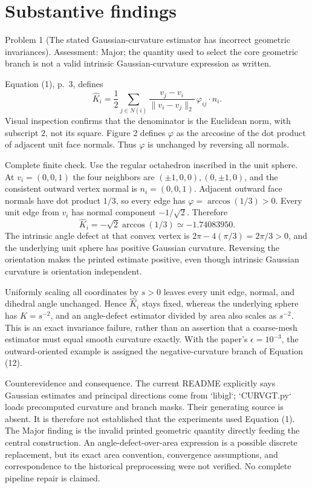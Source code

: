 \documentclass[10pt]{article}
\begin{document}
\section*{Substantive findings}
Problem 1 (The stated Gaussian-curvature estimator has incorrect geometric invariances).  Assessment: Major; the quantity used to select the core geometric branch is not a valid intrinsic Gaussian-curvature expression as written.\par
Equation (1), p. 3, defines \[\widehat K_i=\frac12\sum_{j\in N(i)}
\frac{v_j-v_i}{\|v_i-v_j\|_2}\,\varphi_{ij}\cdot n_i.\] Visual inspection confirms that the denominator is the Euclidean norm, with subscript \(2\), not its square. Figure 2 defines \(\varphi\) as the arccosine of the dot product of adjacent unit face normals. Thus \(\varphi\) is unchanged by reversing all normals.\par
Complete finite check. Use the regular octahedron inscribed in the unit sphere. At \(v_i=(0,0,1)\) the four neighbors are \((\pm1,0,0),(0,\pm1,0)\), and the consistent outward vertex normal is \(n_i=(0,0,1)\). Adjacent outward face normals have dot product \(1/3\), so every edge has \(\varphi=\arccos(1/3)>0\). Every unit edge from \(v_i\) has normal component \(-1/\sqrt2\). Therefore \[\widehat K_i=-\sqrt2\arccos(1/3)\simeq-1.74083950.\] The intrinsic angle defect at that convex vertex is \(2\pi-4(\pi/3)=2\pi/3>0\), and the underlying unit sphere has positive Gaussian curvature. Reversing the orientation makes the printed estimate positive, even though intrinsic Gaussian curvature is orientation independent.\par
Uniformly scaling all coordinates by \(s>0\) leaves every unit edge, normal, and dihedral angle unchanged. Hence \(\widehat K_i\) stays fixed, whereas the underlying sphere has \(K=s^{-2}\), and an angle-defect estimator divided by area also scales as \(s^{-2}\). This is an exact invariance failure, rather than an assertion that a coarse-mesh estimator must equal smooth curvature exactly. With the paper’s \(\epsilon=10^{-3}\), the outward-oriented example is assigned the negative-curvature branch of Equation (12).\par
Counterevidence and consequence. The current README explicitly says Gaussian estimates and principal directions come from `libigl`; `CURVGT.py` loads precomputed curvature and branch masks. Their generating source is absent. It is therefore not established that the experiments used Equation (1). The Major finding is the invalid printed geometric quantity directly feeding the central construction. An angle-defect-over-area expression is a possible discrete replacement, but its exact area convention, convergence assumptions, and correspondence to the historical preprocessing were not verified. No complete pipeline repair is claimed.\par
\end{document}
